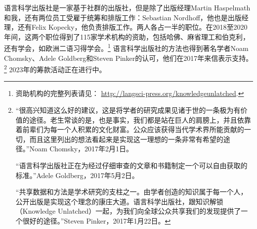 语言科学出版社是一家基于社群的出版社，但是除了出版经理Martin Haspelmath和我，还有两位员工受雇于统筹和排版工作：Sebastian Nordhoff，他也是出版经理，还有Felix Kopecky，他负责排版工作。两人各占一半的职位。在2018至2020年间，这两个职位得到了115家学术机构的资助，包括哈佛、麻省理工和伯克利，还有学会，如欧洲二语习得学会。\footnote{%
 资助机构的完整列表请见： 
  \url{http://langsci-press.org/knowledgeunlatched}.
} 语言科学出版社的方法也得到著名学者Noam Chomsky、Adele Goldberg和Steven Pinker的认可，他们在2017年来信表示支持。
\footnote{%
“很高兴知道这么好的建议，这是将学者的研究成果见诸于世的一条极为有价值的途径。老生常谈的是，也是事实，我们都是站在巨人的肩膀上，并且依靠着前辈们为每一个人积累的文化财富。公众应该获得当代学术界所能贡献的一切，而且这里列出的想法看起来是实现这一理想的一条非常有希望的途径。”Noam Chomsky，2017年2月1日。

“语言科学出版社正在为经过仔细审查的文章和书籍制定一个可以自由获取的标准。”Adele Goldberg，2017年5月2日。

“共享数据和方法是学术研究的支柱之一。由学者创造的知识属于每一个人，公开出版是实现这个理念的康庄大道。语言科学出版社，跟知识解锁（Knowledge Unlatched）一起，为我们向全球公众共享我们的发现提供了一个很好的途径。”Steven Pinker，2017年1月22日。
} 2023年的筹款活动正在进行中。
%

